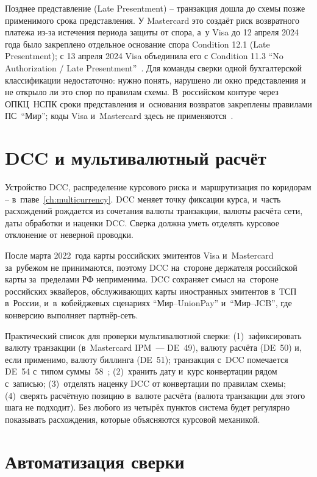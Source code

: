 Позднее представление (Late Presentment) -- транзакция дошла до схемы
позже применимого срока представления. У
Mastercard это создаёт риск возвратного платежа из-за истечения периода защиты
от спора, а~у Visa до 12 апреля 2024 года было закреплено отдельное
основание спора Condition 12.1 (Late Presentment); с 13 апреля 2024
Visa объединила его с Condition 11.3 \enquote{No Authorization /
Late Presentment}~\cite{mc-tpr,visa-core-rules}. Для команды сверки
одной бухгалтерской классификации недостаточно: нужно
понять, нарушено ли окно представления и не открыло ли это спор по
правилам схемы. В~российском контуре через ОПКЦ~НСПК сроки представления и~основания возвратов закреплены правилами ПС~\enquote{Мир}; коды Visa и~Mastercard здесь не применяются~\cite{nspk-mir-rules}.

\section{DCC и мультивалютный расчёт}\label{sec:recon-dcc}

Устройство DCC, распределение курсового риска и~маршрутизация по коридорам --
в~главе~\ref{ch:multicurrency}. DCC меняет точку фиксации курса, и~часть расхождений рождается из сочетания валюты транзакции, валюты расчёта сети, даты обработки и наценки DCC. Сверка должна уметь отделять курсовое отклонение
от неверной проводки.

После марта 2022~года карты российских эмитентов Visa и~Mastercard за~рубежом не принимаются, поэтому DCC на~стороне держателя российской карты за~пределами РФ неприменима. DCC сохраняет смысл на~стороне российских эквайеров, обслуживающих карты иностранных эмитентов в~ТСП в~России, и~в~кобейджевых сценариях \enquote{Мир--UnionPay} и~\enquote{Мир--JCB}, где конверсию выполняет партнёр-сеть.

Практический список для проверки мультивалютной сверки: (1)~зафиксировать
валюту транзакции (в~Mastercard IPM~--- DE~49), валюту расчёта (DE~50)
и, если применимо, валюту биллинга (DE~51); транзакция с~DCC помечается
DE~54 с~типом суммы~58~\cite{mc-dcc-guide};
(2)~хранить дату и~курс конвертации рядом с~записью; (3)~отделять
наценку DCC от конвертации по правилам схемы; (4)~сверять расчётную позицию
в~валюте расчёта (валюта транзакции для этого шага не подходит). Без любого из четырёх
пунктов система будет регулярно показывать расхождения, которые
объясняются курсовой механикой.

\section{Автоматизация сверки}\label{sec:recon-automation}

